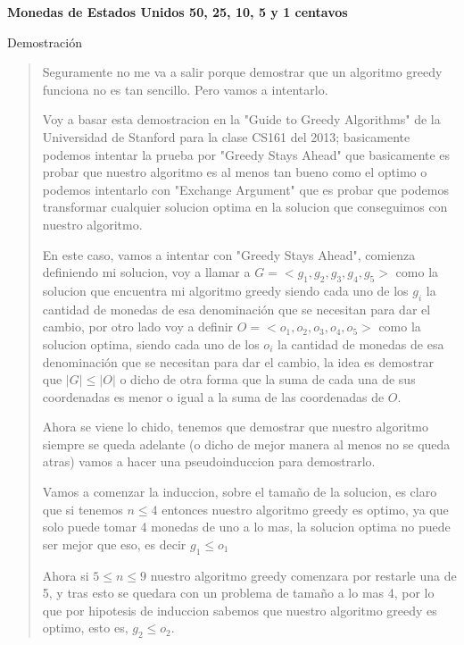 \textbf{Monedas de Estados Unidos 50, 25, 10, 5 y 1 centavos}\vspace{.2cm}

\textcolor{bibi}{Demostración}
\begin{quote}
    Seguramente no me va a salir porque demostrar que un algoritmo greedy funciona no es tan sencillo. Pero vamos a intentarlo. \vspace{.2cm}
    
    Voy a basar esta demostracion en la "Guide to Greedy Algorithms" de la Universidad de Stanford para la clase CS161 del 2013; basicamente podemos intentar la prueba por "Greedy Stays Ahead" que basicamente es probar que nuestro algoritmo es al menos tan bueno como el optimo o podemos intentarlo con "Exchange Argument" que es probar que podemos transformar cualquier solucion optima en la solucion que conseguimos con nuestro algoritmo. \vspace{.2cm}
    
    En este caso, vamos a intentar con "Greedy Stays Ahead", comienza definiendo mi solucion, voy a llamar a $G=<g_1,g_2,g_3,g_4,g_5>$ como la solucion que encuentra mi algoritmo greedy siendo cada uno de los $g_i$ la cantidad de monedas de esa denominación que se necesitan para dar el cambio, por otro lado voy a definir  $O=<o_1,o_2,o_3,o_4,o_5>$ como la solucion optima, siendo cada uno de los $o_i$ la cantidad de monedas de esa denominación que se necesitan para dar el cambio, la idea es demostrar que $|G| \leq |O|$ o dicho de otra forma que la suma de cada una de sus coordenadas es menor o igual a la suma de las coordenadas de $O$. \vspace{.2cm}

    Ahora se viene lo chido, tenemos que demostrar que nuestro algoritmo siempre se queda adelante (o dicho de mejor manera al menos no se queda atras) vamos a hacer una pseudoinduccion para demostrarlo. \vspace{.2cm}

    Vamos a comenzar la induccion, sobre el tamaño de la solucion, es claro que si tenemos $n \leq 4$ entonces nuestro algoritmo greedy es optimo, ya que solo puede tomar 4 monedas de uno a lo mas, la solucion optima no puede ser mejor que eso, es decir $g_1 \leq o_1$ \vspace{.2cm}

    Ahora si $ 5 \leq n \leq 9$ nuestro algoritmo greedy comenzara por restarle una de 5, y tras esto se quedara con un problema de tamaño a lo mas 4, por lo que por hipotesis de induccion sabemos que nuestro algoritmo greedy es optimo, esto es, $g_2 \leq o_2$. \vspace{.2cm}


\end{quote}
